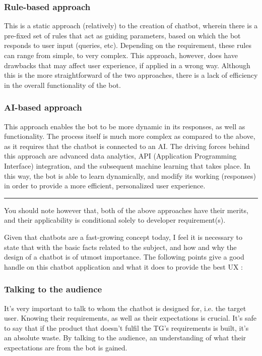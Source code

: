 \documentclass[14pt]{extarticle}
\begin{document}
\subsubsection {Rule-based approach}

This is a static approach (relatively) to the creation of chatbot, wherein there is a pre-fixed set of rules that act as guiding parameters, based on which the bot responds to user input (queries, etc). Depending on the requirement, these rules can range from simple, to very complex. This approach, however, does have drawbacks that may affect user experience, if applied in a wrong way. Although this is the more straightforward of the two approaches, there is a lack of efficiency in the overall functionality of the bot.

\subsubsection {AI-based approach}

This approach enables the bot to be more dynamic in its responses, as well as functionality. The process itself is much more complex as compared to the above, as it requires that the chatbot is connected to an AI. The driving forces behind this approach are advanced data analytics, API (Application Programming Interface) integration, and the subsequent machine learning that takes place. In this way, the bot is able to learn dynamically, and modify its working (responses) in order to provide a more efficient, personalized user experience.

\par\noindent\rule{\textwidth}{0.4pt}

You should note however that, both of the above approaches have their merits, and their applicability is conditional solely to developer requirement(s).

Given that chatbots are a fast-growing concept today, I feel it is necessary to state that  with the basic facts related to the subject, and how and why the design of a chatbot is of utmost importance. The following points give a good handle on this chatbot application and what it does to provide the best UX :

\subsubsection{Talking to the audience}

It's very important to talk to whom the chatbot is designed for, i.e. the target user. Knowing their requirements, as well as their expectations is crucial. It's safe to say that if the product that doesn't fulfil the TG's requirements is built, it's an absolute waste. By talking to the audience, an understanding of what their expectations are from the bot is gained.
\end{document}
